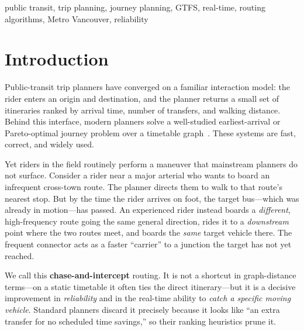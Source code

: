 \documentclass[conference]{IEEEtran}
\begin{document}
\begin{IEEEkeywords}
public transit, trip planning, journey planning, GTFS, real-time, routing
algorithms, Metro Vancouver, reliability
\end{IEEEkeywords}

\section{Introduction}
Public-transit trip planners have converged on a familiar interaction model: the
rider enters an origin and destination, and the planner returns a small set of
itineraries ranked by arrival time, number of transfers, and walking distance.
Behind this interface, modern planners solve a well-studied earliest-arrival or
Pareto-optimal journey problem over a timetable
graph~\cite{raptor,csa,transferpatterns}. These systems are fast, correct, and
widely used.

Yet riders in the field routinely perform a maneuver that mainstream planners do
not surface. Consider a rider near a major arterial who wants to board an
infrequent cross-town route. The planner directs them to walk to that route's
nearest stop. But by the time the rider arrives on foot, the target bus---which
was already in motion---has passed. An experienced rider instead boards a
\emph{different}, high-frequency route going the same general direction, rides it
to a \emph{downstream} point where the two routes meet, and boards the
\emph{same} target vehicle there. The frequent connector acts as a faster
``carrier'' to a junction the target has not yet reached.

We call this \textbf{chase-and-intercept} routing. It is not a shortcut in
graph-distance terms---on a static timetable it often ties the direct
itinerary---but it is a decisive improvement in \emph{reliability} and in the
real-time ability to \emph{catch a specific moving vehicle}. Standard planners
discard it precisely because it looks like ``an extra transfer for no scheduled
time savings,'' so their ranking heuristics prune it.
\end{document}
